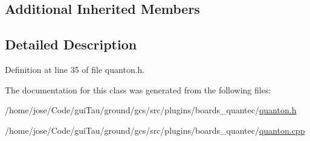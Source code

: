 \subsection*{Additional Inherited Members}


\subsection{Detailed Description}


Definition at line 35 of file quanton.\-h.



The documentation for this class was generated from the following files\-:\begin{DoxyCompactItemize}
\item 
/home/jose/\-Code/gui\-Tau/ground/gcs/src/plugins/boards\-\_\-quantec/\hyperlink{quanton_8h}{quanton.\-h}\item 
/home/jose/\-Code/gui\-Tau/ground/gcs/src/plugins/boards\-\_\-quantec/\hyperlink{quanton_8cpp}{quanton.\-cpp}\end{DoxyCompactItemize}
